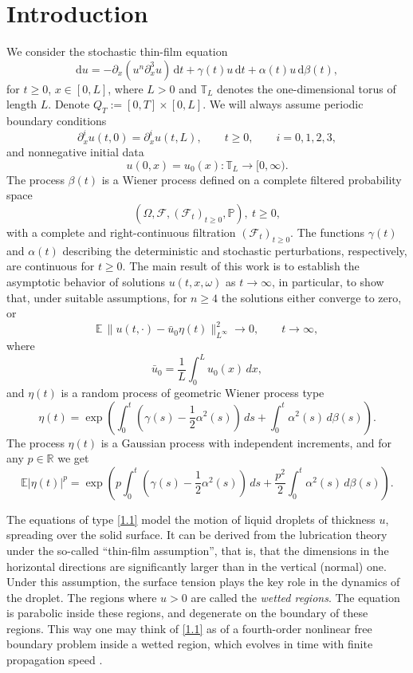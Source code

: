 \documentclass[a4paper,12pt]{article}
\numberwithin{equation}{section}
\newcommand{\R}{{\mathbb R}}
\def\R{\mathbb{R}}
\def\E{\mathbb{E}}
\begin{document}
\section{Introduction}

We consider the stochastic thin-film equation
\begin{equation}
\mathrm{d}u
=
- \partial_x\!\left(u^n \partial_x^3 u\right)\,\mathrm{d}t
+ \gamma(t) u \,\mathrm{d}t
+ \alpha(t) u \,\mathrm{d} \beta (t),
\label{1.1}
\end{equation}
for $t \geq 0$, $x \in [0,L]$, where $L>0$ and $\mathbb{T}_L$ denotes the
one-dimensional torus of length $L$. Denote $Q_T:=[0,T] \times [0,L]$.
We will always assume periodic boundary conditions
\[
\partial_x^i u(t,0) = \partial_x^i u(t,L), \qquad  t \geq 0, 
\qquad i=0,1,2,3,
\]
and nonnegative initial data
\[
u(0,x) = u_0(x) : \mathbb{T}_L \to [0,\infty).
\]
The process $\beta(t)$ is a Wiener process defined on a complete filtered probability
space
\[
(\Omega,\mathcal{F},(\mathcal{F}_t)_{t\ge 0},\mathbb{P}), \ t \geq 0,
\]
with a complete and right-continuous filtration $(\mathcal{F}_t)_{t\ge 0}$.
The functions $\gamma(t)$ and $\alpha(t)$ describing the deterministic and stochastic
perturbations, respectively, are continuous for $t \geq 0$. The main result of this work is to establish the asymptotic behavior of solutions $u(t, x, \omega)$ as $t \to \infty$, in particular, to show that, under suitable assumptions, for $n \geq 4$ the solutions either converge to zero, or
\begin{equation*}
\mathbb{E}\,\|u(t,\cdot)-\bar u_0 \eta(t)\|_{L^\infty}^2 \to 0,
\qquad t \to \infty,
\label{1.2}
\end{equation*}
where $$\bar u_0 = \frac{1}{L} \int_0^L u_0(x) \, dx,$$
and $\eta(t)$ is a random process of geometric Wiener process type
\begin{equation*}
\eta(t) = \exp\!\left(
\int_0^t (\gamma(s) - 
\frac12 \alpha^2(s) ) \, ds + \int_0^t \alpha^2(s)\, d\beta(s)
\right).
\end{equation*}
The process $\eta(t)$ is a Gaussian process with independent increments, and for any $p \in \R$ we get 
\begin{equation}
\E |\eta(t)|^p = \exp\!\left(
p \int_0^t (\gamma(s) - 
\frac12 \alpha^2(s) ) \, ds + \frac{p^2}{2} \int_0^t \alpha^2(s)\, d\beta(s)
\right).
\label{ast}
\end{equation}

The equations of type  \eqref{1.1}  model the motion of liquid droplets of thickness $u$, spreading over the solid surface. It can be derived from the lubrication theory under the so-called ``thin-film assumption'', that is, that the dimensions in the horizontal directions are significantly larger than in the vertical (normal) one. Under this assumption, the surface tension plays the key role in the dynamics of the droplet. The regions where  $u>0$ are called the {\it wetted regions}. The equation is parabolic inside these regions, and degenerate on the boundary of these regions. This way one may think of  \eqref{1.1} as of a  fourth-order nonlinear free boundary problem inside a wetted region, which evolves in time  with finite propagation speed \cite{Bernis}. 
\end{document}
